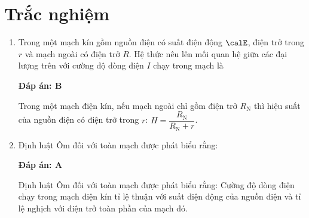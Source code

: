 \setcounter{section}{0}
\section{Trắc nghiệm}
\begin{enumerate}[label=\bfseries Câu \arabic*:]
	\item {}
	
	
	{Trong một mạch kín gồm nguồn điện có suất điện động $\calE$, điện trở trong $r$ và mạch ngoài có điện trở $R$. Hệ thức nêu lên mối quan hệ giữa các đại lượng trên với cường độ dòng điện $I$ chạy trong mạch là
	}
	
	\hideall
	{	\textbf{Đáp án: B} 
		
		Trong một mạch điện kín, nếu mạch ngoài chỉ gồm điện trở $R_\text{N}$ thì hiệu suất của nguồn điện có điện trở trong $r$: $H=\dfrac{R_\text{N}}{R_\text{N}+r}$.
		
	}
	\item {}
	
	
	{	Định luật Ôm đối với toàn mạch được phát biểu rằng: 
	}
	
	\hideall
	{	\textbf{Đáp án: A} 
		
		Định luật Ôm đối với toàn mạch được phát biểu rằng:	Cường độ dòng điện chạy trong mạch điện kín tỉ lệ thuận với suất điện động của nguồn điện và tỉ lệ nghịch với điện trở toàn phần của mạch đó.	
		
}
\end{enumerate}
